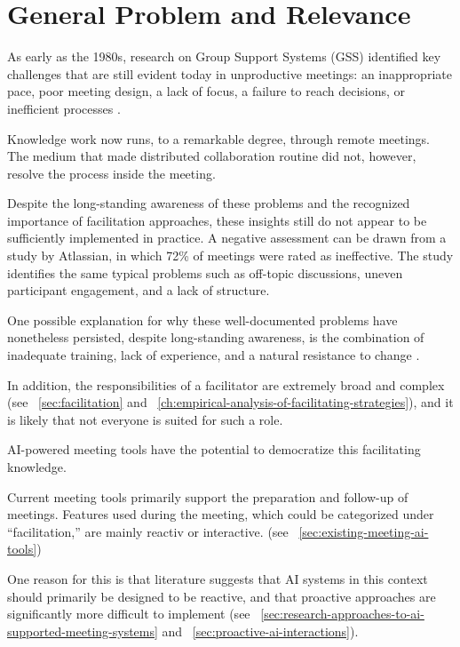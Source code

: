 \section{General Problem and Relevance}

As early as the 1980s, research on Group Support Systems (GSS) identified key
challenges that are still evident today in unproductive meetings: an inappropriate pace,
poor meeting design, a lack of focus, a failure to reach decisions, or inefficient processes
\cite[p. 152]{beranekFacilitationGroupSupport1993}.

Knowledge work now runs, to a remarkable degree, through remote meetings.
The medium that made distributed collaboration routine did not, however, resolve the process
inside the meeting.

Despite the long-standing awareness of these problems and the recognized importance of facilitation approaches,
these insights still do not appear to be sufficiently implemented in practice. A negative
assessment can be drawn from a study by Atlassian, in which 72\% of meetings were rated as ineffective. The
study identifies the same typical problems such as off-topic discussions,
uneven participant engagement, and a lack of structure.
\cite{atlassianWorkplaceWoesMeetings}

One possible explanation for why these well-documented problems have nonetheless persisted, despite
long-standing awareness, is the combination of inadequate training, lack of experience, and a natural
resistance to change \cite[p. 153]{hayneFacilitatorsPerspectiveMeetings}.

In addition, the responsibilities of a facilitator are extremely broad and complex (see
~\ref{sec:facilitation} and ~\ref{ch:empirical-analysis-of-facilitating-strategies}), and it is likely that
not everyone is suited for such a role.

AI-powered meeting tools have the potential to democratize this facilitating knowledge.

Current meeting tools primarily support the preparation and follow-up of meetings. Features used during the
meeting, which could be categorized under “facilitation,” are mainly reactiv or interactive. (see
~\ref{sec:existing-meeting-ai-tools})

One reason for this is that literature suggests that AI systems in this context should
primarily be designed to be reactive, and that proactive approaches are significantly more difficult to
implement (see ~\ref{sec:research-approaches-to-ai-supported-meeting-systems} and ~\ref{sec:proactive-ai-interactions}).

